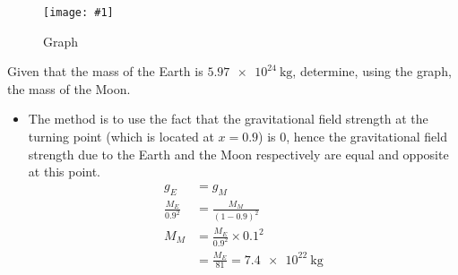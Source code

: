 \documentclass[a4paper,12pt]{article}
\newcommand{\img}[4]{\begin{center}
  \begin{figure}[H]
    \centering
    \texttt{[image: \#1]}
    \caption{#3}
    \label{fig:#4}
  \end{figure}
\end{center}}
\begin{document}
\img{ex/9.png}{0.56}{Graph}{ex9}

Given that the mass of the Earth is $\SI{5.97e24}{\kg}$, determine, using the graph, the mass of the Moon.

\begin{itemize}
  \item The method is to use the fact that the gravitational field strength at the turning point (which is located at $x = 0.9$) is 0, hence the gravitational field strength due to the Earth and the Moon respectively are equal and opposite at this point.
        \begin{align*}
          g_E               & = g_M                               \\
          \frac{M_E}{0.9^2} & = \frac{M_M}{(1 - 0.9)^2}           \\
          M_M               & = \frac{M_E}{0.9^2} \times  0.1^2   \\
                            & = \frac{M_E}{81} = \SI{7.4e22}{\kg}
        \end{align*}
\end{itemize}
\end{document}
